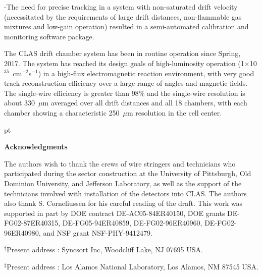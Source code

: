 \noindent
-The need for precise tracking in a system with non-saturated drift velocity 
(necessitated by the requirements of large drift distances, non-flammable gas mixtures 
and low-gain operation) resulted in a semi-automated calibration and monitoring software 
package.

\vskip 10pt
The CLAS drift chamber system has been in routine operation since Spring, 2017. 
The system has reached its design goals of 
high-luminosity operation (1$\times$10$^{35}$~cm$^{-2}$s$^{-1}$) in a 
high-flux electromagnetic reaction environment, with very good track 
reconstruction efficiency over a large range of angles and 
magnetic fields.  The single-wire efficiency is greater than $98\%$ and the
single-wire resolution is about 330~$\mu$m averaged over all drift distances and
all 18 chambers, with each chamber showing a characteristic 250~$\mu$m resolution 
in the cell center.

 pt

{\large{\bf Acknowledgments}}

\vskip 10pt

The authors wish to thank the crews of wire stringers and technicians who 
participated during the sector construction at the University of Pittsburgh,
Old Dominion University, and Jefferson Laboratory, as well as the support of 
the technicians involved with installation of the detectors into CLAS.  The
authors also thank S. Corneliussen for his careful reading of the draft.  This
work was supported in part by DOE contract DE-AC05-84ER40150, DOE grants 
DE-FG02-87ER40315, DE-FG05-94ER40859, DE-FG02-96ER40960, DE-FG02-96ER40980, 
and NSF grant NSF-PHY-9412479.

\vskip 10pt

\noindent
$^{\dagger}$Present address : Syncsort Inc, Woodcliff Lake, NJ 07695 USA.

\noindent
$^{\ddagger}$Present address : Los Alamos National Laboratory, Los Alamos, NM
87545 USA.


